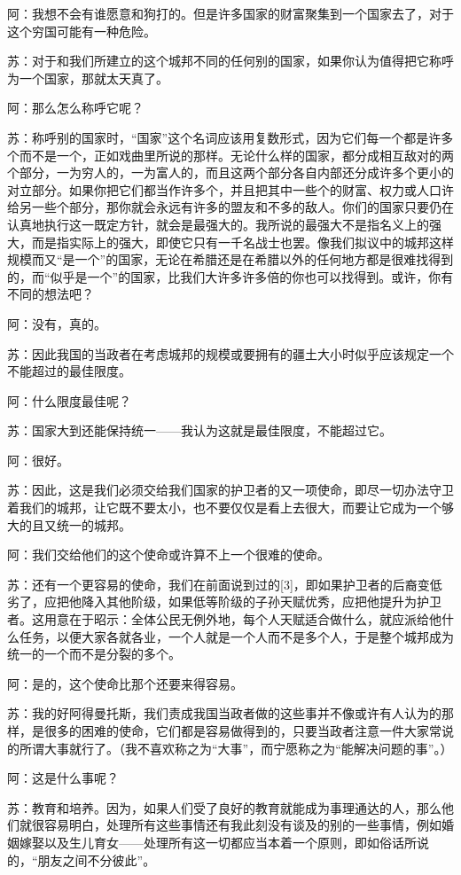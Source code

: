 \documentclass[12pt,oneside]{book}
\begin{document}
阿：我想不会有谁愿意和狗打的。但是许多国家的财富聚集到一个国家去了，对于这个穷国可能有一种危险。

苏：对于和我们所建立的这个城邦不同的任何别的国家，如果你认为值得把它称呼为一个国家，那就太天真了。

阿：那么怎么称呼它呢？

苏：称呼别的国家时，“国家”这个名词应该用复数形式，因为它们每一个都是许多个而不是一个，正如戏曲里所说的那样。无论什么样的国家，都分成相互敌对的两个部分，一为穷人的，一为富人的，而且这两个部分各自内部还分成许多个更小的对立部分。如果你把它们都当作许多个，并且把其中一些个的财富、权力或人口许给另一些个部分，那你就会永远有许多的盟友和不多的敌人。你们的国家只要仍在认真地执行这一既定方针，就会是最强大的。我所说的最强大不是指名义上的强大，而是指实际上的强大，即使它只有一千名战士也罢。像我们拟议中的城邦这样规模而又“是一个”的国家，无论在希腊还是在希腊以外的任何地方都是很难找得到的，而“似乎是一个”的国家，比我们大许多许多倍的你也可以找得到。或许，你有不同的想法吧？

阿：没有，真的。

苏：因此我国的当政者在考虑城邦的规模或要拥有的疆土大小时似乎应该规定一个不能超过的最佳限度。

阿：什么限度最佳呢？

苏：国家大到还能保持统一——我认为这就是最佳限度，不能超过它。

阿：很好。

苏：因此，这是我们必须交给我们国家的护卫者的又一项使命，即尽一切办法守卫着我们的城邦，让它既不要太小，也不要仅仅是看上去很大，而要让它成为一个够大的且又统一的城邦。

阿：我们交给他们的这个使命或许算不上一个很难的使命。

苏：还有一个更容易的使命，我们在前面说到过的[3]，即如果护卫者的后裔变低劣了，应把他降入其他阶级，如果低等阶级的子孙天赋优秀，应把他提升为护卫者。这用意在于昭示：全体公民无例外地，每个人天赋适合做什么，就应派给他什么任务，以便大家各就各业，一个人就是一个人而不是多个人，于是整个城邦成为统一的一个而不是分裂的多个。

阿：是的，这个使命比那个还要来得容易。

苏：我的好阿得曼托斯，我们责成我国当政者做的这些事并不像或许有人认为的那样，是很多的困难的使命，它们都是容易做得到的，只要当政者注意一件大家常说的所谓大事就行了。（我不喜欢称之为“大事”，而宁愿称之为“能解决问题的事”。）

阿：这是什么事呢？

苏：教育和培养。因为，如果人们受了良好的教育就能成为事理通达的人，那么他们就很容易明白，处理所有这些事情还有我此刻没有谈及的别的一些事情，例如婚姻嫁娶以及生儿育女——处理所有这一切都应当本着一个原则，即如俗话所说的，“朋友之间不分彼此”。
\end{document}
